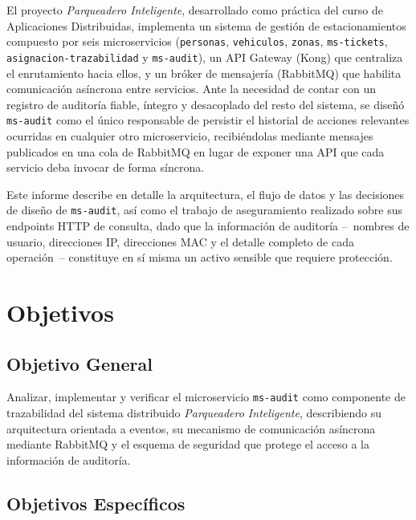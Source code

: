 \documentclass[12pt,letterpaper]{article}
\begin{document}
El proyecto \emph{Parqueadero Inteligente}, desarrollado como práctica del curso de Aplicaciones Distribuidas, implementa un sistema de gestión de estacionamientos compuesto por seis microservicios (\texttt{personas}, \texttt{vehiculos}, \texttt{zonas}, \texttt{ms-tickets}, \texttt{asignacion-trazabilidad} y \texttt{ms-audit}), un API Gateway (Kong) que centraliza el enrutamiento hacia ellos, y un bróker de mensajería (RabbitMQ) que habilita comunicación asíncrona entre servicios. Ante la necesidad de contar con un registro de auditoría fiable, íntegro y desacoplado del resto del sistema, se diseñó \texttt{ms-audit} como el único responsable de persistir el historial de acciones relevantes ocurridas en cualquier otro microservicio, recibiéndolas mediante mensajes publicados en una cola de RabbitMQ en lugar de exponer una API que cada servicio deba invocar de forma síncrona.

Este informe describe en detalle la arquitectura, el flujo de datos y las decisiones de diseño de \texttt{ms-audit}, así como el trabajo de aseguramiento realizado sobre sus endpoints HTTP de consulta, dado que la información de auditoría --~nombres de usuario, direcciones IP, direcciones MAC y el detalle completo de cada operación~-- constituye en sí misma un activo sensible que requiere protección.

\section{Objetivos}

\subsection*{Objetivo General}

Analizar, implementar y verificar el microservicio \texttt{ms-audit} como componente de trazabilidad del sistema distribuido \emph{Parqueadero Inteligente}, describiendo su arquitectura orientada a eventos, su mecanismo de comunicación asíncrona mediante RabbitMQ y el esquema de seguridad que protege el acceso a la información de auditoría.

\subsection*{Objetivos Específicos}
\end{document}
